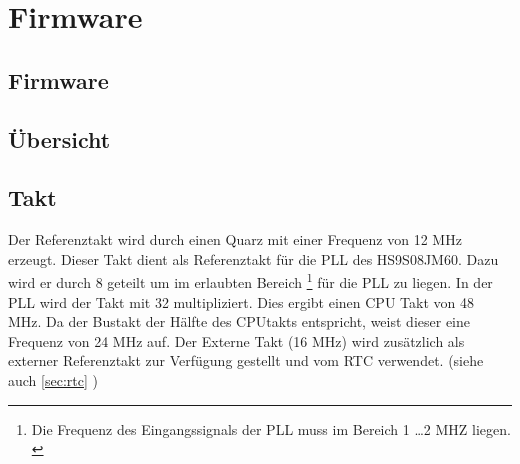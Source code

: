 \ifSTANDALONE
\section{Firmware}
\fi
\ifEMBED
\subsection{Firmware}
\fi

\subsection{Übersicht}

\subsection{Takt}
Der Referenztakt wird durch einen Quarz mit einer Frequenz von 12 MHz erzeugt. 
Dieser Takt dient als Referenztakt für die PLL des HS9S08JM60. Dazu wird er 
durch 8 geteilt um im erlaubten Bereich \footnote{Die Frequenz des 
Eingangssignals der PLL muss im Bereich 1 \ldots 2 MHZ liegen. \cite[p. 
195]{Datasheet:HCS08}} für die PLL zu liegen. In der PLL wird der Takt mit 32 
multipliziert. Dies ergibt einen CPU Takt von 48 MHz. Da der Bustakt der 
Hälfte des CPUtakts entspricht, weist dieser eine Frequenz von 24 MHz auf. 
Der Externe Takt (16 MHz) wird zusätzlich als externer Referenztakt zur 
Verfügung gestellt und vom RTC verwendet. 
(siehe auch \ref{sec:rtc} )

